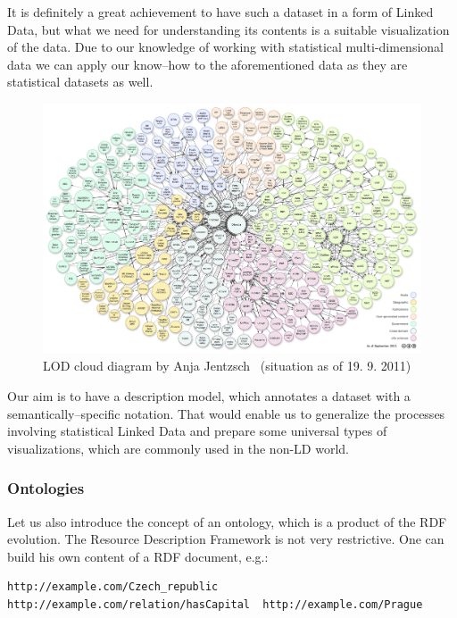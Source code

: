 It is definitely a great achievement to have such a dataset in a form of Linked Data, but
what we need for understanding its contents is a suitable visualization of the data.
Due to our knowledge of working with statistical multi-dimensional data we can apply our know--how
to the aforementioned data as they are statistical datasets as well.

\begin{figure}
	\centering
	\includegraphics[width=150mm]{img/lod-cloud.png}
	\caption{LOD cloud diagram by Anja Jentzsch~\cite{lod-cloud} (situation as of 19. 9. 2011)}
	\label{fig:lod-cloud}
\end{figure}

Our aim is to have a description model, which annotates a dataset with a semantically--specific
notation. That would enable us to generalize the processes involving statistical Linked Data
and prepare some universal types of visualizations, which are commonly used in the non-LD world.

\subsubsection{Ontologies}

Let us also introduce the concept of an ontology, which is a product of the RDF evolution.
The Resource Description Framework is not very restrictive. One can build his own content
of a RDF document, e.g.:

\scriptsize\begin{verbatim}
http://example.com/Czech_republic	http://example.com/relation/hasCapital	http://example.com/Prague
\end{verbatim}\normalsize


